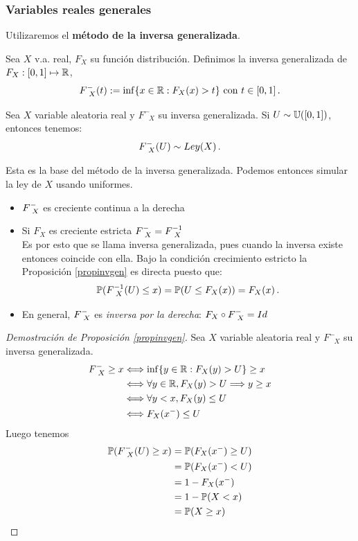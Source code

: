 \subsubsection{Variables reales generales}
Utilizaremos el \textbf{método de la inversa generalizada}.
\begin{definition}
\label{def:invgen}
Sea $X$ v.a. real, $F_X$ su función distribución. Definimos la inversa generalizada de $F_X:[0,1]\mapsto\R$,
$$ \Finvgen(t):=\inf\{x\in\R : F_X(x)>t\} \mbox{ con }t\in[0,1] \, .$$
\end{definition}
\begin{proposition}
\label{propinvgen}
Sea $X$ variable aleatoria real y $F^-_{\mbox{ }X}$ su inversa generalizada. Si $U\sim\unif$, entonces tenemos: $$\Finvgen(U) \sim Ley(X) \, .$$
\end{proposition}
Esta es la base del método de la inversa generalizada. Podemos entonces simular la ley de $X$ usando uniformes.
\begin{remark}
\beforeitemize
\begin{itemize}
    \item $\Finvgen$ es creciente continua a la derecha %
    \item Si $F_X$ es creciente estricta $\Finvgen=\Finv$ \\ Es por esto que se llama inversa generalizada, pues cuando la inversa existe entonces coincide con ella. %
    \newline Bajo la condición crecimiento estricto la Proposición \ref{propinvgen} es directa puesto que:
    $$ \P(\Finv(U)\leq x)= \P(U\leq F_X(x))=F_X(x) \, .$$
    \item En general, $\Finvgen$ es \textit{inversa por la derecha}: $F_X\circ \Finvgen=Id$ \\ %
\end{itemize}
\end{remark}
\demejercicio
\begin{proof}[Demostración de Proposición \ref{propinvgen}]
\gris Sea $X$ variable aleatoria real y $F^-_{\mbox{ }X}$ su inversa generalizada.
\begin{alignat*}{2}
    \Finvgen \geq x & \ssi \inf\{y\in\R : F_X(y)>U\}\geq x\\
     & \ssi \forall y \in \R, F_X(y)>U \Longrightarrow y\geq x \\
     & \ssi \forall y<x, F_X(y)\leq U \\
     & \ssi F_X(x^-)\leq U
\end{alignat*}
Luego tenemos
\begin{alignat*}{2}
    \P(\Finvgen(U) \geq x) & = \P( F_X(x^-) \geq U)\\
     & = \P ( F_X(x^-) < U) \\
     & = 1 - F_X(x^-) \\
     & = 1 - \P(X<x) \\
     & = \P(X\geq x)
\end{alignat*}
\findem
\end{proof}

